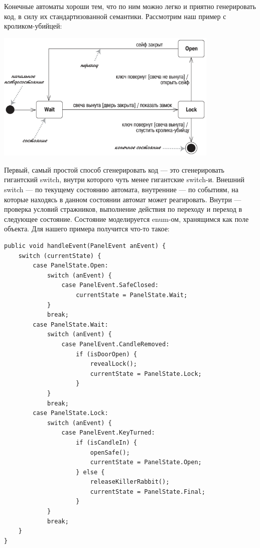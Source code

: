 \documentclass{../mcstext}
\begin{document}
Конечные автоматы хороши тем, что по ним можно легко и приятно генерировать код, в силу их стандартизованной семантики. Рассмотрим наш пример с кроликом-убийцей:

\begin{center}
    \includegraphics[width=0.8\textwidth]{stateTransitionSyntax.png}
\end{center}

Первый, самый простой способ сгенерировать код --- это сгенерировать гигантский switch, внутри которого чуть менее гигантские switch-и. Внешний switch --- по текущему состоянию автомата, внутренние --- по событиям, на которые находясь в данном состоянии автомат может реагировать. Внутри --- проверка условий стражников, выполнение действия по переходу и переход в следующее состояние. Состояние моделируется enum-ом, хранящимся как поле объекта. Для нашего примера получится что-то такое:

\begin{verbatim}
public void handleEvent(PanelEvent anEvent) {
    switch (currentState) {
        case PanelState.Open:
            switch (anEvent) {
                case PanelEvent.SafeClosed:
                    currentState = PanelState.Wait;
            }
            break;
        case PanelState.Wait:
            switch (anEvent) {
                case PanelEvent.CandleRemoved:
                    if (isDoorOpen) {
                        revealLock();
                        currentState = PanelState.Lock;
                    }
            }
            break;
        case PanelState.Lock:
            switch (anEvent) {
                case PanelEvent.KeyTurned:
                    if (isCandleIn) {
                        openSafe();
                        currentState = PanelState.Open;
                    } else {
                        releaseKillerRabbit();
                        currentState = PanelState.Final;
                    }
            }
            break;
    }
}
\end{verbatim}
\end{document}
